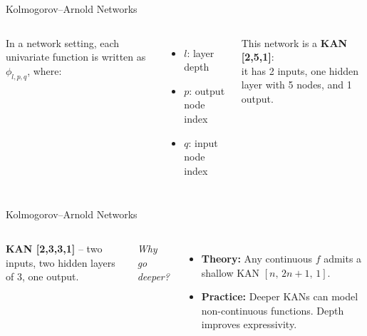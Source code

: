 \documentclass[aspectratio=169]{beamer}
\begin{document}
\begin{frame}{Kolmogorov–Arnold Networks}
	
	\begin{columns}[T,onlytextwidth]
		
		\centering
		\resizebox{!}{0.8\textheight}{}
		
		In a network setting, each univariate function is written as $\phi_{l,p,q}$, where:
		\vspace{0.8em}
		\begin{itemize}
			\item $l$: layer depth  
			\item $p$: output node index  
			\item $q$: input node index
		\end{itemize}
		
		\vspace{1em}
		This network is a \textbf{KAN [2,5,1]}:\\it has 2 inputs, one hidden layer with 5 nodes, and 1 output.
		
	\end{columns}
	
\end{frame}


\begin{frame}{Kolmogorov–Arnold Networks}
	\begin{columns}[T,onlytextwidth]
		
		\column{0.5\textwidth}
		\centering
		\resizebox{!}{0.8\textheight}{}
		
		\column{0.45\textwidth}
		\textbf{KAN [2,3,3,1]} – two inputs, two hidden layers of 3, one output.
		
		\vspace{0.8em}
		\textit{Why go deeper?}
		\begin{itemize}
			\item \textbf{Theory:} Any continuous $f$ admits a shallow KAN \([n,\,2n{+}1,\,1]\).
			\item \textbf{Practice:} Deeper KANs can model non-continuous functions. Depth improves expressivity.
		\end{itemize}
		
	\end{columns}
\end{frame}
\end{document}
